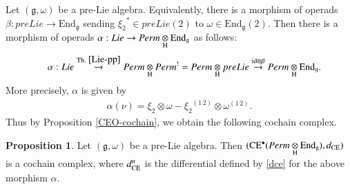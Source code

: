 \documentclass[12pt]{amsart}
\theoremstyle{definition}
\newtheorem{pro}[thm]{Proposition}
\newtheorem{defi}[thm]{Definition}
\newcommand{\g}{\mathfrak g}
\newcommand{\frkC}{\mathfrak C}
\newcommand{\id}{\mathrm{id}}
\newcommand{\Hom}{\mathrm{Hom}}
\newcommand{\End}{\mathrm{End}}
\newcommand{\ot}{\otimes}
\newcommand{\ceo}{{\rm CE}^{\bullet}}
\newcommand{\pl}{{\rm pLie}}
\begin{document}
Let $(\g,\omega)$ be a pre-Lie algebra. Equivalently, there is a morphism of operads $\beta:preLie\to \End_\g$ sending ${\xi_2}^*\in preLie(2)$ to $\omega\in \End_\g(2)$. Then there is a morphism of operads  $\alpha: Lie\to Perm\underset{\rm H}{\ot}\End_\g$ as follows:
\begin{eqnarray}\label{Lie-to-pL-Endg}
	&&\alpha:Lie\overset{{\rm Th.}~ \ref{Lie-pp}}{\to} Perm\underset{\rm H}{\ot} Perm^!=Perm\underset{\rm H}{\ot} preLie\overset{\id\ot\beta}{\to}Perm\underset{\rm H}{\ot}\End_\g.
\end{eqnarray}
More precisely, $\alpha$ is given by
\begin{align}\label{alph-nu}
	\alpha(\nu)=\xi_2 \ot \omega-{\xi_2}^{(1\,2)}\ot \omega^{(1\,2)}.
\end{align}
Thus by Proposition \ref{CEO-cochain}, we obtain the following cochain complex.
\begin{pro}\label{CE-pL-Endg}
	Let $(\g,\omega)$ be a pre-Lie algebra. Then $(\ceo(Perm\underset{\rm H}{\ot}\End_\g),d_{\rm CE})$ is a cochain complex, where $d^n_{\rm CE}$ is the differential defined by \eqref{dce} for the above morphism $\alpha$.
\end{pro}

\end{document}
